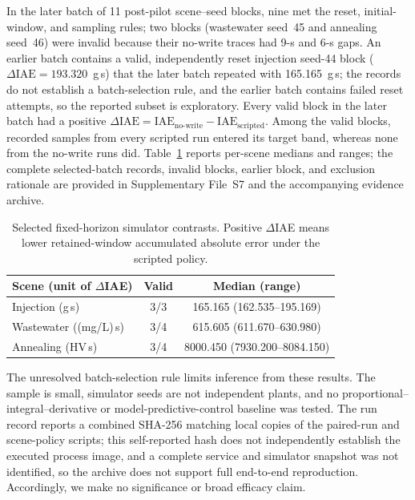 In the later batch of 11 post-pilot scene--seed blocks, nine met the reset, initial-window, and sampling rules; two blocks (wastewater seed~45 and annealing seed~46) were invalid because their no-write traces had 9-s and 6-s gaps. An earlier batch contains a valid, independently reset injection seed-44 block ($\Delta\mathrm{IAE}=193.320$~g\,s) that the later batch repeated with 165.165~g\,s; the records do not establish a batch-selection rule, and the earlier batch contains failed reset attempts, so the reported subset is exploratory. Every valid block in the later batch had a positive $\Delta\mathrm{IAE}=\mathrm{IAE}_{\mathrm{no\text{-}write}}-\mathrm{IAE}_{\mathrm{scripted}}$. Among the valid blocks, recorded samples from every scripted run entered its target band, whereas none from the no-write runs did. Table~\ref{tab:selected-iae} reports per-scene medians and ranges; the complete selected-batch records, invalid blocks, earlier block, and exclusion rationale are provided in Supplementary File~S7 and the accompanying evidence archive.

\begin{table}[!t]
\centering
\caption{Selected fixed-horizon simulator contrasts. Positive $\Delta$IAE means lower retained-window accumulated absolute error under the scripted policy.}
\label{tab:selected-iae}
\footnotesize
\setlength{\tabcolsep}{3pt}
\begin{tabular}{@{}lcc@{}}
\toprule
Scene (unit of $\Delta$IAE) & Valid & Median (range) \\
\midrule
Injection (g\,s) & 3/3 & 165.165 (162.535--195.169) \\
Wastewater ((mg/L)\,s) & 3/4 & 615.605 (611.670--630.980) \\
Annealing (HV\,s) & 3/4 & 8000.450 (7930.200--8084.150) \\
\bottomrule
\end{tabular}
\end{table}

The unresolved batch-selection rule limits inference from these results. The sample is small, simulator seeds are not independent plants, and no proportional--integral--derivative or model-predictive-control baseline was tested. The run record reports a combined SHA-256 matching local copies of the paired-run and scene-policy scripts; this self-reported hash does not independently establish the executed process image, and a complete service and simulator snapshot was not identified, so the archive does not support full end-to-end reproduction. Accordingly, we make no significance or broad efficacy claim.

